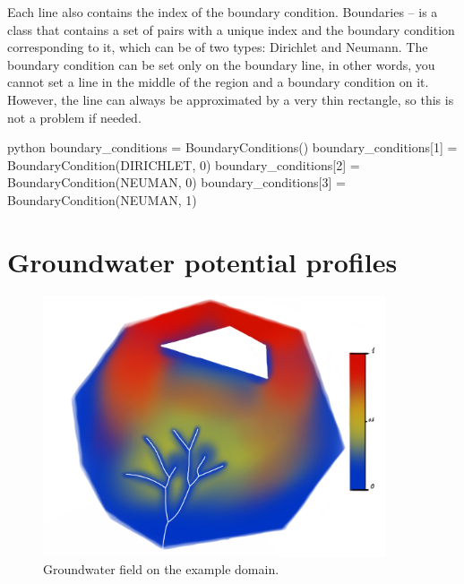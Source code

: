 \documentclass[]{pracamgr}
\begin{document}
      Each line also contains the index of the boundary condition. Boundaries -- is a class that contains a set of pairs with a unique index and the boundary condition corresponding to it, which can be of two types: Dirichlet and Neumann. The boundary condition can be set only on the boundary line, in other words, you cannot set a line in the middle of the region and a boundary condition on it. However, the line can always be approximated by a very thin rectangle, so this is not a problem if needed.

      \begin{mintedbox}{python}
        boundary_conditions = BoundaryConditions()
        boundary_conditions[1] = BoundaryCondition(DIRICHLET, 0)
        boundary_conditions[2] = BoundaryCondition(NEUMAN, 0)
        boundary_conditions[3] = BoundaryCondition(NEUMAN, 1)\end{mintedbox}

    \section{Groundwater potential profiles}

      \begin{figure}[H]
        \centering
        \includegraphics[width=0.9\textwidth]{figs/solver.jpg}        
        \caption {Groundwater field on the example domain.}
        \label{solver}
      \end{figure}
\end{document}
